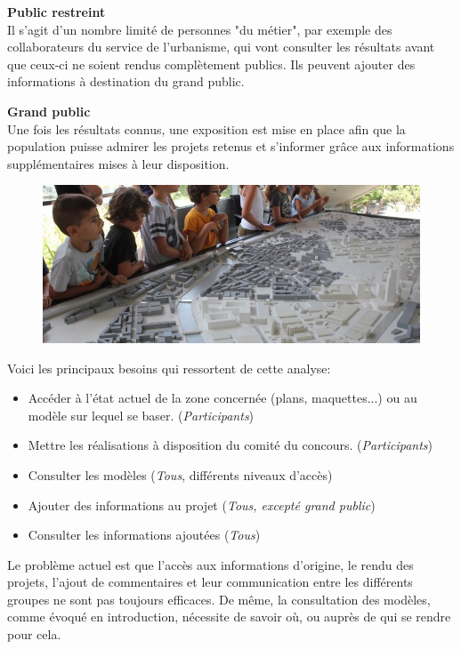 \textbf{Public restreint} \\
Il s'agit d'un nombre limité de personnes "du métier", par exemple des collaborateurs du service de l'urbanisme, qui vont consulter les résultats avant que ceux-ci ne soient rendus complètement publics.
Ils peuvent ajouter des informations à destination du grand public.

\textbf{Grand public} \\
Une fois les résultats connus, une exposition est mise en place afin que la population puisse admirer les projets retenus et s'informer grâce aux informations supplémentaires mises à leur disposition.

\begin{figure}[h]
    \centering
    \includegraphics[width=\linewidth]{Figures/exposition-maquette-pav.jpg}
    \label{fig:exposition-maquette-pav}
\end{figure}

Voici les principaux besoins qui ressortent de cette analyse:
\begin{itemize}
    \item Accéder à l'état actuel de la zone concernée (plans, maquettes...) ou au modèle sur lequel se baser. (\textit{Participants})
    \item Mettre les réalisations à disposition du comité du concours. (\textit{Participants})
    \item Consulter les modèles (\textit{Tous}, différents niveaux d'accès)
    \item Ajouter des informations au projet (\textit{Tous, excepté grand public})
    \item Consulter les informations ajoutées (\textit{Tous})
\end{itemize}

Le problème actuel est que l'accès aux informations d'origine, le rendu des projets, l'ajout de commentaires et leur communication entre les différents groupes ne sont pas toujours efficaces. De même, la consultation des modèles, comme évoqué en introduction, nécessite de savoir où, ou auprès de qui se rendre pour cela.

